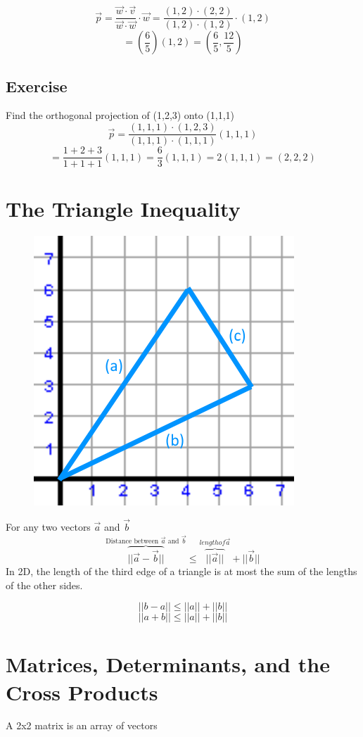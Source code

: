 \documentclass{article}
\begin{document}
\[\vec{p}=\frac{\vec{w}\cdot\vec{v}}{\vec{w}\cdot\vec{w}}\cdot \vec{w}=\frac{(1,2)\cdot (2,2)}{(1,2)\cdot(1,2)}\cdot(1,2)\]
\[=(\frac{6}{5})(1,2)=(\frac{6}{5},\frac{12}{5})\]

\subsection*{Exercise}
Find the orthogonal projection of (1,2,3) onto (1,1,1)
\[\vec{p}=\frac{(1,1,1)\cdot(1,2,3)}{(1,1,1)\cdot(1,1,1)}(1,1,1)\]
\[=\frac{1+2+3}{1+1+1}(1,1,1)=\frac{6}{3}(1,1,1)=2(1,1,1)=(2,2,2)\]

\section{The Triangle Inequality}
\begin{figure}[h!]
    \centering
    \includegraphics[scale=.5]{TriangleInequality.png}
    \label{}
\end{figure}
For any two vectors $\vec{a}$ and $\vec{b}$
\[\overbrace{||\vec{a}-\vec{b}||}^{\mbox{Distance between $\vec{a}$ and $\vec{b}$}}\leq\overbrace{||\vec{a}||}^{length of \vec{a}}+||\vec{b}||\]
In 2D, the length of the third edge of a triangle is at most the sum of the lengths of the other sides.

\[||b-a|| \leq ||a||+||b||\]
\[||a+b|| \leq ||a||+||b||\]


\section{Matrices, Determinants, and the Cross Products}
A 2x2 matrix is an array of vectors
\end{document}
